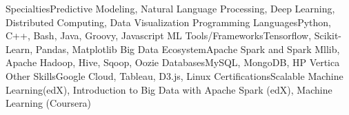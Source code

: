 \begin{cvskills}
\cvskill
{Specialties}{Predictive Modeling, Natural Language Processing, Deep Learning, Distributed Computing, Data Visualization}
\cvskill
{Programming Languages}{Python, C++, Bash, Java, Groovy, Javascript}
\cvskill
{ML Tools/Frameworks}{Tensorflow, Scikit-Learn, Pandas, Matplotlib}
\cvskill
{Big Data Ecosystem}{Apache Spark and Spark Mllib, Apache Hadoop, Hive, Sqoop, Oozie}
\cvskill
{Databases}{MySQL, MongoDB, HP Vertica}
\cvskill
{Other Skills}{Google Cloud, Tableau, D3.js, Linux}
\cvskill
{Certifications}{Scalable Machine Learning(edX), Introduction to Big Data with Apache Spark (edX), Machine Learning (Coursera)}
\end{cvskills}
